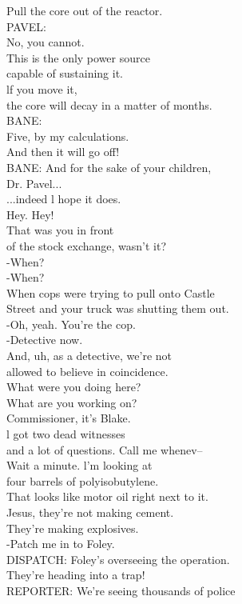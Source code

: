 \documentclass{article}
\begin{document}
\begin{multicols}{3}
Pull the core out of the reactor.\\
PAVEL:\\
No, you cannot.\\
This is the only power source\\
capable of sustaining it.\\
lf you move it,\\
the core will decay in a matter of months.\\
BANE:\\
Five, by my calculations.\\
And then it will go off!\\
BANE: And for the sake of your children,\\
Dr. Pavel...\\
...indeed l hope it does.\\
Hey. Hey!\\
That was you in front\\
of the stock exchange, wasn't it?\\
-When?\\
-When?\\
When cops were trying to pull onto Castle\\
Street and your truck was shutting them out.\\
-Oh, yeah. You're the cop.\\
-Detective now.\\
And, uh, as a detective, we're not\\
allowed to believe in coincidence.\\
What were you doing here?\\
What are you working on?\\
Commissioner, it's Blake.\\
l got two dead witnesses\\
and a lot of questions. Call me whenev--\\
Wait a minute. l'm looking at\\
four barrels of polyisobutylene.\\
That looks like motor oil right next to it.\\
Jesus, they're not making cement.\\
They're making explosives.\\
-Patch me in to Foley.\\
DISPATCH: Foley's overseeing the operation.\\
They're heading into a trap!\\
REPORTER: We're seeing thousands of police\\

\end{multicols}
\end{document}
